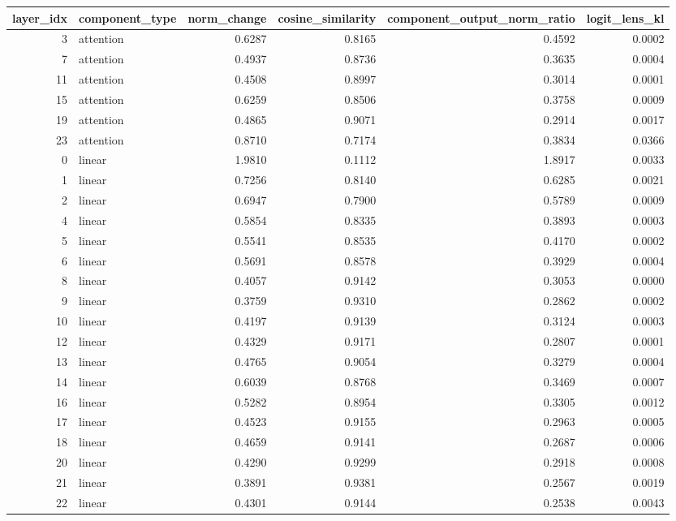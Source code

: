 \begin{tabular}{rlrrrr}
\toprule
layer_idx & component_type & norm_change & cosine_similarity & component_output_norm_ratio & logit_lens_kl \\
\midrule
3 & attention & 0.6287 & 0.8165 & 0.4592 & 0.0002 \\
7 & attention & 0.4937 & 0.8736 & 0.3635 & 0.0004 \\
11 & attention & 0.4508 & 0.8997 & 0.3014 & 0.0001 \\
15 & attention & 0.6259 & 0.8506 & 0.3758 & 0.0009 \\
19 & attention & 0.4865 & 0.9071 & 0.2914 & 0.0017 \\
23 & attention & 0.8710 & 0.7174 & 0.3834 & 0.0366 \\
0 & linear & 1.9810 & 0.1112 & 1.8917 & 0.0033 \\
1 & linear & 0.7256 & 0.8140 & 0.6285 & 0.0021 \\
2 & linear & 0.6947 & 0.7900 & 0.5789 & 0.0009 \\
4 & linear & 0.5854 & 0.8335 & 0.3893 & 0.0003 \\
5 & linear & 0.5541 & 0.8535 & 0.4170 & 0.0002 \\
6 & linear & 0.5691 & 0.8578 & 0.3929 & 0.0004 \\
8 & linear & 0.4057 & 0.9142 & 0.3053 & 0.0000 \\
9 & linear & 0.3759 & 0.9310 & 0.2862 & 0.0002 \\
10 & linear & 0.4197 & 0.9139 & 0.3124 & 0.0003 \\
12 & linear & 0.4329 & 0.9171 & 0.2807 & 0.0001 \\
13 & linear & 0.4765 & 0.9054 & 0.3279 & 0.0004 \\
14 & linear & 0.6039 & 0.8768 & 0.3469 & 0.0007 \\
16 & linear & 0.5282 & 0.8954 & 0.3305 & 0.0012 \\
17 & linear & 0.4523 & 0.9155 & 0.2963 & 0.0005 \\
18 & linear & 0.4659 & 0.9141 & 0.2687 & 0.0006 \\
20 & linear & 0.4290 & 0.9299 & 0.2918 & 0.0008 \\
21 & linear & 0.3891 & 0.9381 & 0.2567 & 0.0019 \\
22 & linear & 0.4301 & 0.9144 & 0.2538 & 0.0043 \\
\bottomrule
\end{tabular}
